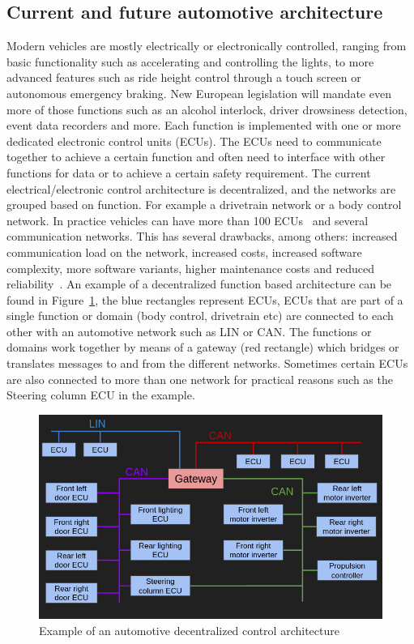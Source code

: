 \subsection{Current and future automotive architecture}
\label{sec:architectures}
Modern vehicles are mostly electrically or electronically controlled, ranging from basic functionality such as accelerating and controlling the lights, to more advanced features such as ride height control through a touch screen or autonomous emergency braking. New European legislation will mandate even more of those functions such as an alcohol interlock, driver drowsiness detection, event data recorders and more. Each function is implemented with one or more dedicated electronic control units (ECUs). The ECUs need to communicate together to achieve a certain function and often need to interface with other functions for data or to achieve a certain safety requirement. The current electrical/electronic control architecture is decentralized, and the networks are grouped based on function. For example a drivetrain network or a body control network. In practice vehicles can have more than 100 ECUs~\cite{bandur2021making} and several communication networks. This has several drawbacks, among others: increased communication load on the network, increased costs, increased software complexity, more software variants, higher maintenance costs and reduced reliability~\cite{bandur2021making}. An example of a decentralized function based architecture can be found in Figure~\ref{fig:functional-arch}, the blue rectangles represent ECUs, ECUs that are part of a single function or domain (body control, drivetrain etc) are connected to each other with an automotive network such as LIN or CAN. The functions or domains work together by means of a gateway (red rectangle) which bridges or translates messages to and from the different networks. Sometimes certain ECUs are also connected to more than one network for practical reasons such as the Steering column ECU in the example.

\begin{figure}[htb]
    \centering
    \includegraphics[width=\textwidth]{images/functional-arch.png}
    \caption{Example of an automotive decentralized control architecture}
    \label{fig:functional-arch}
\end{figure}

